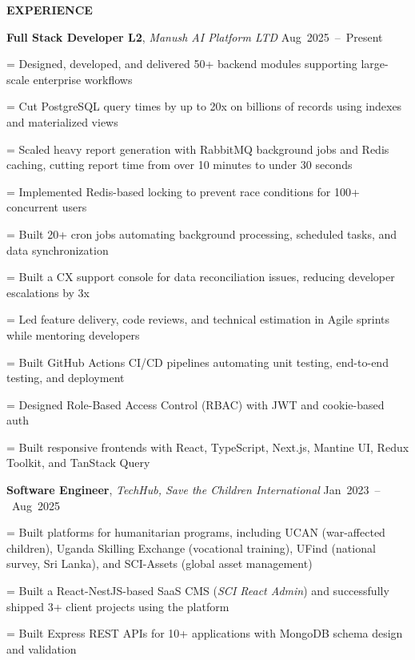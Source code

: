 \documentclass[a4paper]{article}
\newcommand{\sectionfont}{%
  \fontsize{12pt}{14pt}\selectfont\bfseries
}
\newlength{\listindent}
\newcommand{\sectiontitle}[1]{%
  \par
  \vspace{14pt}
  {\sectionfont #1}\par
  \vspace{6pt}
}
\newlength{\bulletgap}
\newcommand{\resumebullet}[1]{%
  \begingroup
  \leftskip=\listindent
  \parindent=0pt
  \noindent
  \llap{%
    \raisebox{0.15ex}{%
      \fontsize{7}{7}\selectfont -
    }%
    \hspace{6pt}%
  }%
  #1\par
  \endgroup
  \vspace{\bulletgap}%
}
\newcommand{\experienceheader}[3]{%
  \noindent
  \textbf{#1}, \textit{#2}%
  \hfill
  \mbox{#3}%
  \par
  \vspace{1pt}
}
\begin{document}
\sectiontitle{EXPERIENCE}

\experienceheader
{Full Stack Developer L2}
{Manush AI Platform LTD}
{Aug 2025 -- Present}

\resumebullet{Designed, developed, and delivered 50+ backend modules supporting large-scale enterprise workflows}

\resumebullet{Cut PostgreSQL query times by up to 20x on billions of records using indexes and materialized views}

\resumebullet{Scaled heavy report generation with RabbitMQ background jobs and Redis caching, cutting report time from over 10 minutes to under 30 seconds}



\resumebullet{Implemented Redis-based locking to prevent race conditions for 100+ concurrent users}

\resumebullet{Built 20+ cron jobs automating background processing, scheduled tasks, and data synchronization}

\resumebullet{Built a CX support console for data reconciliation issues, reducing developer escalations by 3x}

\resumebullet{Led feature delivery, code reviews, and technical estimation in Agile sprints while mentoring developers}

\resumebullet{Built GitHub Actions CI/CD pipelines automating unit testing, end-to-end testing, and deployment}

\resumebullet{Designed Role-Based Access Control (RBAC) with JWT and cookie-based auth}


\resumebullet{Built responsive frontends with React, TypeScript, Next.js, Mantine UI, Redux Toolkit, and TanStack Query}

\vspace{13pt}

\experienceheader
{Software Engineer}
{TechHub, Save the Children International}
{Jan 2023 -- Aug 2025}

\resumebullet{Built platforms for humanitarian programs, including UCAN (war-affected children), Uganda Skilling Exchange (vocational training), UFind (national survey, Sri Lanka), and SCI-Assets (global asset management)}

\resumebullet{Built a React-NestJS-based SaaS CMS (\textit{SCI React Admin}) and successfully shipped 3+ client projects using the platform}

\resumebullet{Built Express REST APIs for 10+ applications with MongoDB schema design and validation}
\end{document}

